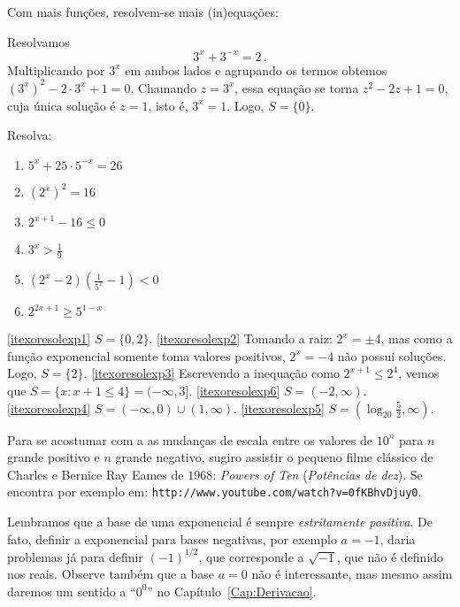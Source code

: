 Com mais funções, resolvem-se mais (in)equações:
\begin{ex}
Resolvamos $$3^x+3^{-x}=2\,.$$
Multiplicando por $3^x$ em ambos lados e agrupando os termos obtemos
$(3^x)^2-2\cdot 3^x+1=0$. Chamando $z=3^x$, essa equação se torna $z^2-2z+1=0$,
cuja única solução é $z=1$, isto é, $3^x=1$. Logo, $S=\{0\}$.
\end{ex}

\begin{exo}
Resolva:
\begin{multicols}{3}
 \begin{enumerate}
  \item\label{itexoresolexp1} $5^x+25\cdot 5^{-x}=26$
  \item\label{itexoresolexp2} $(2^x)^2=16$
  \item\label{itexoresolexp3} $2^{x+1}-16\leq 0$
  \item\label{itexoresolexp6} $3^x>\tfrac19$
 \item\label{itexoresolexp4} $(2^x-2)(\tfrac{1}{5^x}-1)<0$
 \item\label{itexoresolexp5} $2^{2x+1}\geq 5^{1-x}$
 \end{enumerate}
\end{multicols}
\vspace{0.01cm}
\begin{sol}
\eqref{itexoresolexp1} $S=\{0,2\}$.
\eqref{itexoresolexp2}  Tomando a raiz: $2^x=\pm 4$, mas como a função
exponencial somente toma valores positivos, $2^x=-4$ não possui soluções. Logo,
$S=\{2\}$.
\eqref{itexoresolexp3} Escrevendo a inequação como $2^{x+1}\leq 2^4$, vemos que
$S=\{x:x+1\leq 4\}=(-\infty,3]$.
\eqref{itexoresolexp6} $S=(-2,\infty)$.
\eqref{itexoresolexp4} $S=(-\infty,0)\cup (1,\infty)$.
\eqref{itexoresolexp5} $S=(\log_{20}\tfrac52,\infty)$.
\end{sol}
\end{exo}

\begin{obs}
Para se acostumar com a as mudanças de escala entre os valores de $10^{n}$ para
$n$ grande positivo e $n$ grande negativo, sugiro assistir o pequeno filme
clássico de Charles e Bernice Ray Eames de $1968$: \emph{Powers of Ten}
(\emph{Potências de dez}). Se encontra por
exemplo em:
\verb|http://www.youtube.com/watch?v=0fKBhvDjuy0|.
\end{obs}

\begin{obs}
Lembramos que a base de uma exponencial é sempre \emph{estritamente positiva}.
De fato, definir a exponencial para bases negativas, por exemplo $a=-1$, daria 
problemas já para definir $(-1)^{1/2}$, que corresponde a $\sqrt{-1}$, que
não é definido nos reais.
Observe também que a base $a=0$ não é interessante, mas mesmo assim daremos um 
sentido a ``$0^0$'' no Capítulo~\ref{Cap:Derivacao}.
\end{obs}

